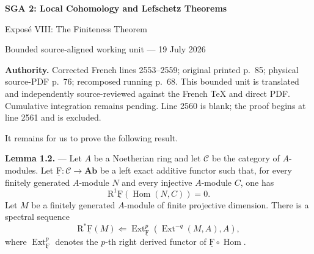 \documentclass[10pt,a4paper]{article}
\newcommand{\Ab}{\mathbf{Ab}}
\newcommand{\CatC}{\mathcal C}
\newcommand{\cF}{\underline{\mathrm F}}
\newcommand{\Ext}{\operatorname{Ext}}
\newcommand{\R}{\mathrm R}
\begin{document}
\begin{center}
  {\Large\bfseries SGA 2: Local Cohomology and Lefschetz Theorems}\par\smallskip
  {\large Expos\'e VIII: The Finiteness Theorem}\par
  \small Bounded source-aligned working unit --- 19 July 2026
\end{center}
\noindent\colorbox{softgray}{\parbox{0.95\linewidth}{\footnotesize\textbf{Authority.}
Corrected French lines 2553--2559; original printed p.~85; physical
source-PDF p.~76; recomposed running p.~68. This bounded unit is translated
and independently source-reviewed against the French TeX and direct PDF.
Cumulative integration remains pending. Line 2560 is blank; the proof begins
at line 2561 and is excluded.}}

It remains for us to prove the following result.

\medskip
\noindent\textbf{Lemma 1.2.} --- Let $A$ be a Noetherian ring and let $\CatC$
be the category of $A$-modules. Let
$\cF\colon\CatC\longrightarrow\Ab$ be a left exact additive functor such that,
for every finitely generated $A$-module $N$ and every injective $A$-module
$C$, one has
\[
  \R^1\cF(\operatorname{Hom}(N,C))=0.
\]
Let $M$ be a finitely generated $A$-module of finite projective dimension.
There is a spectral sequence
\[
  \R^\ast\cF(M)
    \Longleftarrow
  \Ext_{\cF}^{p}(\Ext^{-q}(M,A),A),
\]
where $\Ext_{\cF}^{p}$ denotes the $p$-th right derived functor of
$\cF\circ\operatorname{Hom}$.
\end{document}

